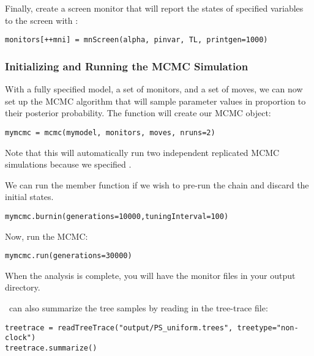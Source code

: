 Finally, create a screen monitor that will report the states of specified variables to the screen with :
{\tt \begin{snugshade*}
\begin{lstlisting}
monitors[++mni] = mnScreen(alpha, pinvar, TL, printgen=1000)
\end{lstlisting}
\end{snugshade*}}


\subsubsection{Initializing and Running the MCMC Simulation}

With a fully specified model, a set of monitors, and a set of moves, we can now set up the MCMC algorithm that will sample parameter values in proportion to their posterior probability. The  function will create our MCMC object:
{\tt \begin{snugshade*}
\begin{lstlisting}
mymcmc = mcmc(mymodel, monitors, moves, nruns=2)
\end{lstlisting}
\end{snugshade*}}
Note that this will automatically run two independent replicated MCMC simulations because we specified .

We can run the  member function if we wish to pre-run the chain and discard the initial states. 
{\tt \begin{snugshade*}
\begin{lstlisting}
mymcmc.burnin(generations=10000,tuningInterval=100)
\end{lstlisting}
\end{snugshade*}}


Now, run the MCMC:
{\tt \begin{snugshade*}
\begin{lstlisting}
mymcmc.run(generations=30000)
\end{lstlisting}
\end{snugshade*}}

When the analysis is complete, you will have the monitor files in your output directory.

\RevBayes~can also summarize the tree samples by reading in the tree-trace file:
{\tt \begin{snugshade*}
\begin{lstlisting}
treetrace = readTreeTrace("output/PS_uniform.trees", treetype="non-clock")
treetrace.summarize()
\end{lstlisting}
\end{snugshade*}}


